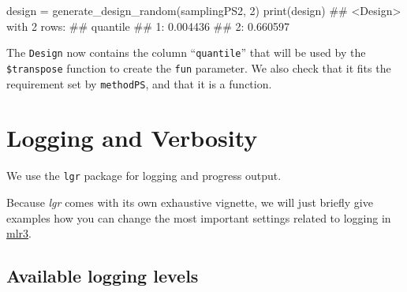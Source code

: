 \documentclass[
  11pt,
  parskip=half,
  DIV=calc,
  BCOR=10mm,
  x11names]{scrbook}
\newenvironment{Shaded}{}{}
\newcommand{\DecValTok}[1]{#1}
\newcommand{\KeywordTok}[1]{\textcolor[rgb]{0.00,0.00,1.00}{#1}}
\newcommand{\NormalTok}[1]{#1}
\newcommand{\OperatorTok}[1]{#1}
\newcommand{\StringTok}[1]{\textcolor[rgb]{0.00,0.50,0.50}{#1}}
\begin{document}
\begin{Shaded}
\begin{Highlighting}[]
\NormalTok{design =}\StringTok{ }\KeywordTok{generate_design_random}\NormalTok{(samplingPS2, }\DecValTok{2}\NormalTok{)}
\KeywordTok{print}\NormalTok{(design)}
\NormalTok{## <Design> with 2 rows:}
\NormalTok{##    quantile}
\NormalTok{## 1: 0.004436}
\NormalTok{## 2: 0.660597}
\end{Highlighting}
\end{Shaded}

The \texttt{Design} now contains the column ``\texttt{quantile}'' that will be used by the \texttt{\$transpose} function to create the \texttt{fun} parameter.
We also check that it fits the requirement set by \texttt{methodPS}, and that it is a function.

\begin{Shaded}
\end{Shaded}

\hypertarget{logging}{%
\section{Logging and Verbosity}\label{logging}}

We use the \texttt{lgr} package for logging and progress output.

Because \emph{lgr} comes with its own exhaustive vignette, we will just briefly give examples how you can change the most important settings related to logging in \href{https://mlr3.mlr-org.com}{mlr3}.

\hypertarget{available-logging-levels}{%
\subsection{Available logging levels}\label{available-logging-levels}}
\end{document}
